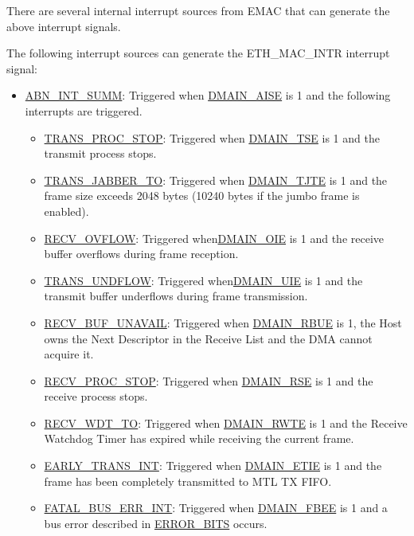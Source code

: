 \documentclass[main\_\_EN.tex]{subfiles}
\begin{document}
There are several internal interrupt sources from EMAC that can generate the above interrupt signals.

The following interrupt sources can generate the ETH\_MAC\_INTR interrupt signal:
\begin{itemize}
\item \hyperref[regdesc:DMASTATUSREG]{ABN\_INT\_SUMM}: Triggered when \hyperref[regdesc:DMAINENREG]{DMAIN\_AISE} is 1 and the following interrupts are triggered.
    \begin{itemize}
    \item \hyperref[regdesc:DMASTATUSREG]{TRANS\_PROC\_STOP}: Triggered when \hyperref[regdesc:DMAINENREG]{DMAIN\_TSE} is 1 and the transmit process stops.
    \item \hyperref[regdesc:DMASTATUSREG]{TRANS\_JABBER\_TO}: Triggered when \hyperref[regdesc:DMAINENREG]{DMAIN\_TJTE} is 1 and the frame size exceeds 2048 bytes (10240 bytes if the jumbo frame is enabled).
    \item \hyperref[regdesc:DMASTATUSREG]{RECV\_OVFLOW}: Triggered when\hyperref[regdesc:DMAINENREG]{DMAIN\_OIE}
     is 1 and the receive buffer overflows during frame reception.
    \item \hyperref[regdesc:DMASTATUSREG]{TRANS\_UNDFLOW}: Triggered when\hyperref[regdesc:DMAINENREG]{DMAIN\_UIE} is 1 and the transmit buffer underflows during frame transmission.
    \item \hyperref[regdesc:DMASTATUSREG]{RECV\_BUF\_UNAVAIL}: Triggered when \hyperref[regdesc:DMAINENREG]{DMAIN\_RBUE} is 1, the Host owns the Next Descriptor in the Receive List and the DMA cannot acquire it.
    \item \hyperref[regdesc:DMASTATUSREG]{RECV\_PROC\_STOP}: Triggered when \hyperref[regdesc:DMAINENREG]{DMAIN\_RSE} is 1 and the receive process stops.
    \item \hyperref[regdesc:DMASTATUSREG]{RECV\_WDT\_TO}: Triggered when \hyperref[regdesc:DMAINENREG]{DMAIN\_RWTE} is 1 and the Receive Watchdog Timer has expired while receiving the current frame.
    \item \hyperref[regdesc:DMASTATUSREG]{EARLY\_TRANS\_INT}: Triggered when \hyperref[regdesc:DMAINENREG]{DMAIN\_ETIE} is 1 and the frame has been completely transmitted to MTL TX FIFO.
    \item \hyperref[regdesc:DMASTATUSREG]{FATAL\_BUS\_ERR\_INT}: Triggered when \hyperref[regdesc:DMAINENREG]{DMAIN\_FBEE} is 1 and a bus error described in  \hyperref[regdesc:DMAINENREG]{ERROR\_BITS} occurs.
    \end{itemize}


\end{itemize}
\end{document}
